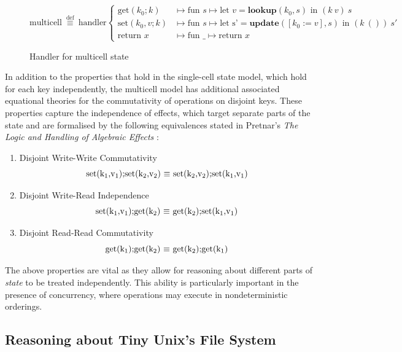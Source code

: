 \documentclass[logo,bsc,singlespacing,parskip]{infthesis}
\begin{document}
\begin{figure}[H]
\centering

\[
\text{multicell}\ \overset{\text{def}}{\equiv} \ \text{handler} \left\{
\begin{array}{ll}
\text{get}(k_0; k) &\mapsto \text{fun } s \mapsto \text{let } v = \textbf{lookup}(k_0, s) \text{ in } (k\ v)\ s \\
\text{set}(k_0, v; k) &\mapsto \text{fun } s \mapsto \text{let s'} = \textbf{update}([k_0:=v],s) \text{ in } (k\ ())\ s'\ \\
\text{return } x &\mapsto \text{fun } \_ \mapsto \text{return } x
\end{array}
\right.
\]
\caption{Handler for multicell state}
\label{fig:multicell-handler}
\end{figure}

In addition to the properties that hold in the single-cell state model, which hold for each key independently,  the multicell model has additional associated equational theories for the commutativity of operations on disjoint keys. These properties capture the independence of effects, which target separate parts of the state and are formalised by the following equivalences stated in Pretnar's \textit{The Logic and Handling of
Algebraic Effects} \cite{Pretnar:2010}:
\begin{enumerate}
    \item Disjoint Write-Write Commutativity \[ \text{set(k\textsubscript{1},v\textsubscript{1});set(k\textsubscript{2},v\textsubscript{2}) $\equiv$ set(k\textsubscript{2},v\textsubscript{2});set(k\textsubscript{1},v\textsubscript{1})} \] 
    \item Disjoint Write-Read Independence \[ \text{set(k\textsubscript{1},v\textsubscript{1});get(k\textsubscript{2}) $\equiv$ get(k\textsubscript{2});set(k\textsubscript{1},v\textsubscript{1})} \] 
    \item Disjoint Read-Read Commutativity \[\text{get(k\textsubscript{1});get(k\textsubscript{2}) $\equiv$ get(k\textsubscript{2});get(k\textsubscript{1})} \] 
\end{enumerate}

The above properties are vital as they allow for reasoning about different parts of \textit{state} to be treated independently. This ability is particularly important in the presence of concurrency, where operations may execute in nondeterministic orderings.


\subsection{Reasoning about Tiny Unix's File System}
\end{document}
